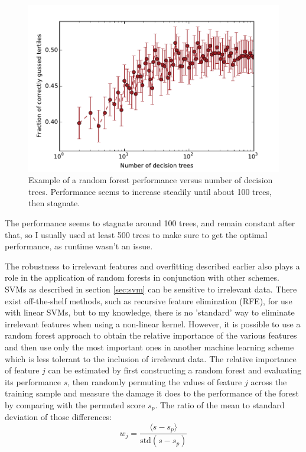 \begin{figure}
	\includegraphics[width=\figwidth]{pics/ml/determine_ntrees.pdf}
	\caption{Example of a random forest performance versus number of decision trees. Performance seems to increase steadily until about 100 trees, then stagnate.}
	\label{fig:determine_ntrees}
\end{figure}
The performance seems to stagnate around 100 trees, and remain constant after that, so I usually used at least 500 trees to make sure to get the optimal performance, as runtime wasn't an issue.

The robustness to irrelevant features and overfitting described earlier also plays a role in the application of random forests in conjunction with other schemes. SVMs as described in section \ref{sec:svm} can be sensitive to irrelevant data\cite{Pietersma2011}. There exist off-the-shelf methods, such as recursive feature elimination (RFE)\cite{Guyon2002}, for use with linear SVMs, but to my knowledge, there is no 'standard' way to eliminate irrelevant features when using a non-linear kernel. However, it is possible to use a random forest approach to obtain the relative importance of the various features and then use only the most important ones in another machine learning scheme which is less tolerant to the inclusion of irrelevant data. The relative importance of feature $j$ can be estimated  by first constructing a random forest and evaluating its performance $s$, then randomly permuting the values of feature $j$ across the training sample and measure the damage it does to the performance of the forest by comparing with the permuted score $s_p$. The ratio of the mean to standard deviation of those differences:
\begin{equation}
	w_j = \frac{\langle s-s_p \rangle}{\mathrm{std}(s - s_p)}
\end{equation}


